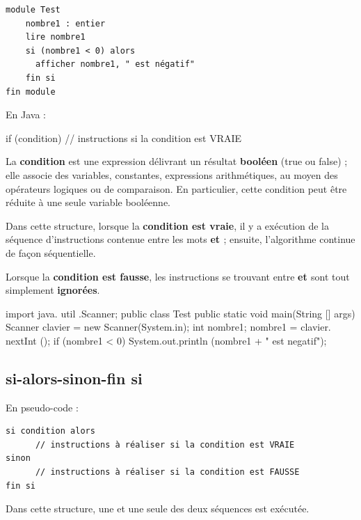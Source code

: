 \documentclass[11pt,a4paper]{article}
\begin{document}
            \par
        \begin{verbatim}
module Test
    nombre1 : entier
    lire nombre1 
    si (nombre1 < 0) alors
      afficher nombre1, " est négatif"
    fin si
fin module
    \end{verbatim}En Java :
            \par
        \begin{Java}
if (condition) { 
      // instructions si la condition est VRAIE
}
      \end{Java}
        La \textbf{condition} est une expression d\'elivrant un r\'esultat 
        \textbf{bool\'een} (true ou false) ; elle associe
        des variables, constantes, expressions arithm\'etiques, au moyen des op\'erateurs logiques ou de
        comparaison. En particulier, cette condition peut \^etre r\'eduite \`a une seule variable bool\'eenne.
      
            \par
        
        Dans cette structure, lorsque la \textbf{condition est vraie}, il y a ex\'ecution 
        de la s\'equence d'instructions contenue entre les mots \textbf{{} 
        et \textbf{}} ; ensuite, l'algorithme continue de fa\c con
        s\'equentielle.
      
            \par
        
        Lorsque la \textbf{condition est fausse}, 
        les instructions se trouvant entre \textbf{{} 
        et \textbf{}} sont tout simplement \textbf{ignor\'ees}.
      
            \par
        \begin{Java}
import java. util .Scanner;
public class Test {
    public static void main(String [] args) {
      Scanner clavier = new Scanner(System.in);
      int nombre1;
      nombre1 = clavier. nextInt ();
      if (nombre1 < 0) {
        System.out.println (nombre1 + " est negatif");
      }
    }
}
    \end{Java}\subsection{si-alors-sinon-fin si}En pseudo-code :
            \par
        \begin{verbatim}
si condition alors
      // instructions à réaliser si la condition est VRAIE
sinon
      // instructions à réaliser si la condition est FAUSSE
fin si
      \end{verbatim}
        Dans cette structure, une et une seule des deux s\'equences est ex\'ecut\'ee.
      
\end{document}
